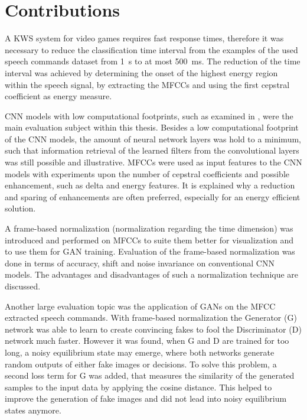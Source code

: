 
\section{Contributions}
A KWS system for video games requires fast response times, therefore it was necessary to reduce the classification time interval from the examples of the used speech commands dataset \cite{Warden2018} from \SI{1}{\second} to at most \SI{500}{\milli\second}.
The reduction of the time interval was achieved by determining the onset of the highest energy region within the speech signal, by extracting the MFCCs and using the first cepstral coefficient as energy measure.

CNN models with low computational footprints, such as examined in \cite{Sainath2015}, were the main evaluation subject within this thesis.
Besides a low computational footprint of the CNN models, the amount of neural network layers was hold to a minimum, such that information retrieval of the learned filters from the convolutional layers was still possible and illustrative.
MFCCs were used as input features to the CNN models with experiments upon the number of cepstral coefficients and possible enhancement, such as delta and energy features.
It is explained why a reduction and sparing of enhancements are often preferred, especially for an energy efficient solution.

A frame-based normalization (normalization regarding the time dimension) was introduced and performed on MFCCs to suite them better for visualization and to use them for GAN training.
Evaluation of the frame-based normalization was done in terms of accuracy, shift and noise invariance on conventional CNN models.
The advantages and disadvantages of such a normalization technique are discussed.

Another large evaluation topic was the application of GANs on the MFCC extracted speech commands. 
With frame-based normalization the Generator (G) network was able to learn to create convincing fakes to fool the Discriminator (D) network much faster.
However it was found, when G and D are trained for too long, a noisy equilibrium state may emerge, where both networks generate random outputs of either fake images or decisions.
To solve this problem, a second loss term for G was added, that measures the similarity of the generated samples to the input data by applying the cosine distance.
This helped to improve the generation of fake images and did not lead into noisy equilibrium states anymore.

